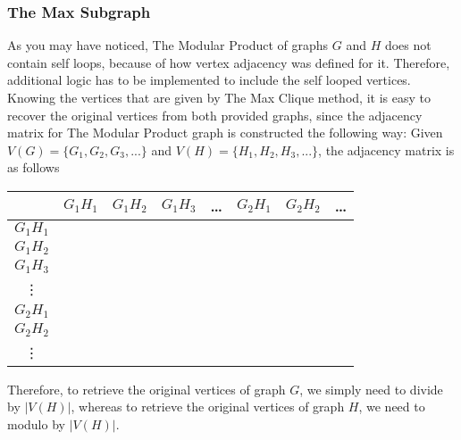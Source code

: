 \subsubsection{The Max Subgraph}
As you may have noticed, The Modular Product of graphs $G$ and $H$ does not contain self loops, because of how vertex adjacency was defined for it. Therefore, additional logic has to be implemented to include the self looped vertices.\newline
Knowing the vertices that are given by The Max Clique method, it is easy to recover the original vertices from both provided graphs, since the adjacency matrix for The Modular Product graph is constructed the following way:\newline
Given $V(G)=\{G_1, G_2, G_3, ...\}$ and $V(H)=\{H_1, H_2, H_3, ...\}$, the adjacency matrix is as follows
\begin{center}
\begin{tabular}{c|c c c c c c c}
              & $G_1H_1$ & $G_1H_2$ & $G_1H_3$ & \dots & $G_2H_1$ & $G_2H_2$ & \dots \\
    \hline
     $G_1H_1$ &  \\
     $G_1H_2$ &  \\
     $G_1H_3$ &  \\
     \vdots   &  \\
     $G_2H_1$ &  \\
     $G_2H_2$ &  \\
     \vdots   & 
\end{tabular}
\end{center}
Therefore, to retrieve the original vertices of graph $G$, we simply need to divide by $|V(H)|$, whereas to retrieve the original vertices of graph $H$, we need to modulo by $|V(H)|$.

\newpage
